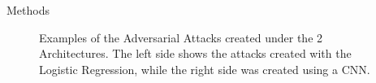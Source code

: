 \documentclass{beamer}
\begin{document}
	\begin{frame}{Methods}
		\begin{figure}[h!]
			\centering
			\caption{\enspace Examples of the Adversarial Attacks created under the 2 Architectures. The left side shows the attacks created with the Logistic Regression, while the right side was created using a CNN.}
		\end{figure}
	\end{frame}
	
\end{document}
